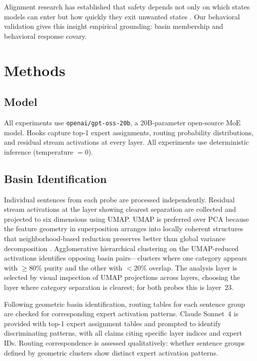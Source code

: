 \documentclass[11pt,a4paper]{article}
\begin{document}
Alignment research has established that safety depends not only on which states models can enter but how quickly they exit unwanted states \citep{bai2022,ganguli2023}. Our behavioral validation gives this insight empirical grounding: basin membership and behavioral response covary.

\section{Methods}

\subsection{Model}

All experiments use \texttt{openai/gpt-oss-20b}, a 20B-parameter open-source MoE model. Hooks capture top-1 expert assignments, routing probability distributions, and residual stream activations at every layer. All experiments use deterministic inference (temperature $= 0$).

\subsection{Basin Identification}

Individual sentences from each probe are processed independently. Residual stream activations at the layer showing clearest separation are collected and projected to six dimensions using UMAP. UMAP is preferred over PCA because the feature geometry in superposition arranges into locally coherent structures that neighborhood-based reduction preserves better than global variance decomposition \citep{elhage2022_superposition}. Agglomerative hierarchical clustering on the UMAP-reduced activations identifies opposing basin pairs---clusters where one category appears with $\geq$80\% purity and the other with $<$20\% overlap. The analysis layer is selected by visual inspection of UMAP projections across layers, choosing the layer where category separation is clearest; for both probes this is layer~23.

Following geometric basin identification, routing tables for each sentence group are checked for corresponding expert activation patterns. Claude Sonnet~4 is provided with top-1 expert assignment tables and prompted to identify discriminating patterns, with all claims citing specific layer indices and expert IDs. Routing correspondence is assessed qualitatively: whether sentence groups defined by geometric clusters show distinct expert activation patterns.
\end{document}
